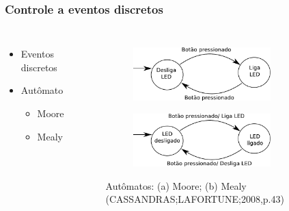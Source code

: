 
\begin{frame}
\frametitle{Controle a eventos discretos}
\begin{columns}
	\begin{itemize}
	\item Eventos discretos
	\item Autômato
		\begin{itemize}
		\item Moore
		\item Mealy
		\end{itemize}
	\end{itemize}
	
	\begin{figure}[h]
     \centering
     \captionsetup{width=0.85\textwidth,font=footnotesize,textfont=bf}
     \begin{subfigure}[b]{\textwidth}
 	\centering
         \includegraphics[width=0.85\textwidth,height=\textheight,keepaspectratio]{Figuras/moore.pdf}
         \caption{\centering \label{fig:moore}}
     \end{subfigure}
     
     \begin{subfigure}[b]{\textwidth}
 	\centering
         \includegraphics[width=0.85\textwidth,height=5\textheight,keepaspectratio]{Figuras/mealy.pdf}
         \caption{\centering \label{fig:mealy}}
     \end{subfigure}
	\caption{Autômatos: (a) Moore; (b) Mealy (CASSANDRAS;LAFORTUNE;2008,p.43)}
 \end{figure}
	
\end{columns}
\end{frame}


